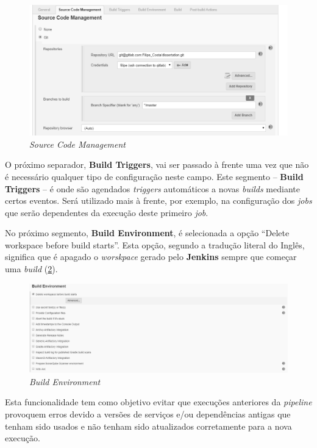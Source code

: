 \begin{figure}[hbt!]
\centering
\includegraphics[width=0.9\linewidth]{Cap5/JenkinsSourceCodeManagement.png}
\caption{\textit{Source Code Management}}
\label{Fig:Fig33}
\end{figure}

\hspace{1cm}O próximo separador, \textbf{Build Triggers}, vai ser passado à frente uma vez que não é necessário qualquer tipo de configuração neste campo. Este segmento -- \textbf{Build Triggers} -- é onde são agendados \textit{triggers} automáticos a novas \textit{builds} mediante certos eventos. Será utilizado mais à frente, por exemplo, na configuração dos \textit{jobs} que serão dependentes da execução deste primeiro \textit{job}.

\hspace{1cm}No próximo segmento, \textbf{Build Environment}, é selecionada a opção ``Delete workspace before build starts''. Esta opção, segundo a tradução literal do Inglês, significa que é apagado o \textit{worskpace} gerado pelo \textbf{Jenkins} sempre que começar uma \textit{build} (\ref{Fig:Fig34}). 

\begin{figure}[hbt!]
\centering
\includegraphics[width=0.9\linewidth]{Cap5/JenkinsBuildEnvironment.png}
\caption{\textit{Build Environment}}
\label{Fig:Fig34}
\end{figure}

Esta funcionalidade tem como objetivo evitar que execuções anteriores da \textit{pipeline} provoquem erros devido a versões de serviços e/ou dependências antigas que tenham sido usados e não tenham sido atualizados corretamente para a nova execução.

